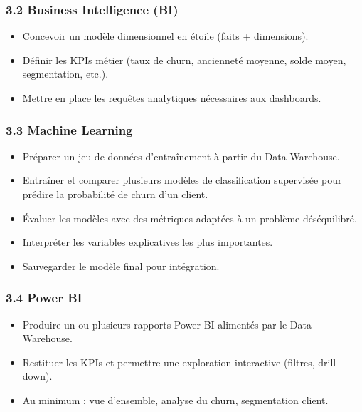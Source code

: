 \documentclass[11pt,a4paper]{article}
\providecommand{\tightlist}{\setlength{\itemsep}{0pt}\setlength{\parskip}{0pt}}
\begin{document}
\subsubsection{3.2 Business Intelligence
(BI)}\label{business-intelligence-bi}

\begin{itemize}
\tightlist
\item
  Concevoir un modèle dimensionnel en étoile (faits + dimensions).
\item
  Définir les KPIs métier (taux de churn, ancienneté moyenne, solde
  moyen, segmentation, etc.).
\item
  Mettre en place les requêtes analytiques nécessaires aux dashboards.
\end{itemize}

\subsubsection{3.3 Machine Learning}\label{machine-learning}

\begin{itemize}
\tightlist
\item
  Préparer un jeu de données d'entraînement à partir du Data Warehouse.
\item
  Entraîner et comparer plusieurs modèles de classification supervisée
  pour prédire la probabilité de churn d'un client.
\item
  Évaluer les modèles avec des métriques adaptées à un problème
  déséquilibré.
\item
  Interpréter les variables explicatives les plus importantes.
\item
  Sauvegarder le modèle final pour intégration.
\end{itemize}

\subsubsection{3.4 Power BI}\label{power-bi}

\begin{itemize}
\tightlist
\item
  Produire un ou plusieurs rapports Power BI alimentés par le Data
  Warehouse.
\item
  Restituer les KPIs et permettre une exploration interactive (filtres,
  drill-down).
\item
  Au minimum : vue d'ensemble, analyse du churn, segmentation client.
\end{itemize}
\end{document}
